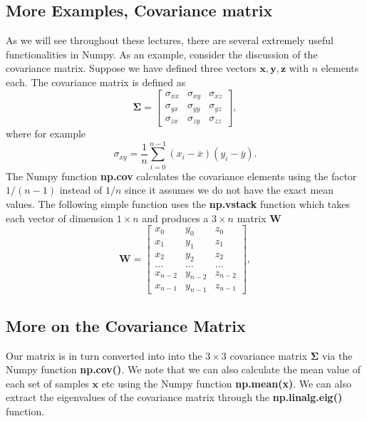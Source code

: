 \documentclass[%
oneside,                 %
final,                   %
10pt]{article}
\begin{document}
\subsection*{More Examples, Covariance matrix}

As we will see throughout these lectures, there are several extremely useful functionalities in Numpy.
As an example, consider the discussion of the covariance matrix. Suppose we have defined three vectors
$\bm{x}, \bm{y}, \bm{z}$ with $n$ elements each. The covariance matrix is defined as 
\[
\bm{\Sigma} = \begin{bmatrix} \sigma_{xx} & \sigma_{xy} & \sigma_{xz} \\
                              \sigma_{yx} & \sigma_{yy} & \sigma_{yz} \\
                              \sigma_{zx} & \sigma_{zy} & \sigma_{zz} 
             \end{bmatrix},
\]
where for example
\[
\sigma_{xy} =\frac{1}{n} \sum_{i=0}^{n-1}(x_i- \overline{x})(y_i- \overline{y}).
\]
The Numpy function \textbf{np.cov} calculates the covariance elements using the factor $1/(n-1)$ instead of $1/n$ since it assumes we do not have the exact mean values. 
The following simple function uses the \textbf{np.vstack} function which takes each vector of dimension $1\times n$ and produces a $3\times n$ matrix $\bm{W}$
\[
\bm{W} = \begin{bmatrix} x_0 & y_0 & z_0 \\
                          x_1 & y_1 & z_1 \\
                          x_2 & y_2 & z_2 \\
                          \dots & \dots & \dots \\
                          x_{n-2} & y_{n-2} & z_{n-2} \\
                          x_{n-1} & y_{n-1} & z_{n-1}
             \end{bmatrix},
\]


\subsection*{More on the Covariance Matrix}

Our matrix is in turn converted into into the $3\times 3$ covariance matrix
$\bm{\Sigma}$ via the Numpy function \textbf{np.cov()}. We note that we can also calculate
the mean value of each set of samples $\bm{x}$ etc using the Numpy
function \textbf{np.mean(x)}. We can also extract the eigenvalues of the
covariance matrix through the \textbf{np.linalg.eig()} function.
\end{document}
